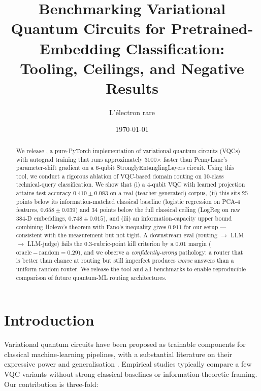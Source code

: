 

\title{%
Benchmarking Variational Quantum Circuits for Pretrained-Embedding Classification:\\
Tooling, Ceilings, and Negative Results
}

\author[1]{L'\'electron rare}

\date{\today}


\maketitle

\begin{abstract}
We release \torchvqc{}, a pure-PyTorch implementation of variational quantum circuits (VQCs) with autograd training that runs approximately 3000$\times$ faster than PennyLane's parameter-shift gradient on a 6-qubit StronglyEntanglingLayers circuit. Using this tool, we conduct a rigorous ablation of VQC-based domain routing on 10-class technical-query classification. We show that (i) a 4-qubit VQC with learned projection attains test accuracy $0.410 \pm 0.083$ on a real (teacher-generated) corpus, (ii) this sits 25 points below its information-matched classical baseline (logistic regression on PCA-4 features, $0.658 \pm 0.039$) and 34 points below the full classical ceiling (LogReg on raw 384-D embeddings, $0.748 \pm 0.015$), and (iii) an information-capacity upper bound combining Holevo's theorem with Fano's inequality gives $0.911$ for our setup --- consistent with the measurement but not tight. A downstream eval (routing $\to$ LLM $\to$ LLM-judge) fails the $0.3$-rubric-point kill criterion by a $0.01$ margin ($\mathrm{oracle}-\mathrm{random}=0.29$), and we observe a \emph{confidently-wrong} pathology: a router that is better than chance at routing but still imperfect produces \emph{worse} answers than a uniform random router. We release the tool and all benchmarks to enable reproducible comparison of future quantum-ML routing architectures.
\end{abstract}

\section{Introduction}

Variational quantum circuits have been proposed as trainable components for classical machine-learning pipelines, with a substantial literature on their expressive power \citep{du2020expressive,abbas2021effective} and generalisation \citep{caro2022generalization}. Empirical studies typically compare a few VQC variants without strong classical baselines or information-theoretic framing. Our contribution is three-fold:

